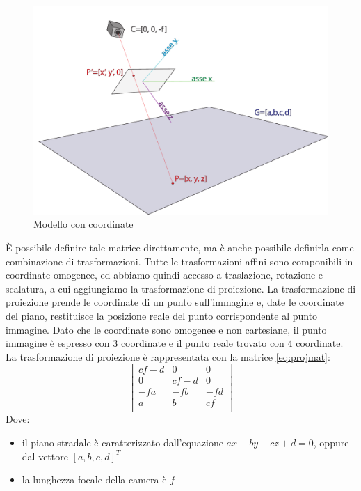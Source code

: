 \begin{figure}
    \caption{Modello con coordinate}
    \label{fig:camera coords}
    \centering
    \includegraphics[width=\textwidth]{images/camera coords.pdf}
\end{figure}

È possibile definire tale matrice direttamente, ma è anche possibile definirla come combinazione di trasformazioni.
Tutte le trasformazioni affini sono componibili in coordinate omogenee, ed abbiamo quindi accesso a traslazione, rotazione e scalatura, a cui aggiungiamo la trasformazione di proiezione.
La trasformazione di proiezione prende le coordinate di un punto sull'immagine e, date le coordinate del piano, restituisce la posizione reale del punto corrispondente al punto immagine.
Dato che le coordinate sono omogenee e non cartesiane, il punto immagine è espresso con 3 coordinate e il punto reale trovato con 4 coordinate.
La trasformazione di proiezione è rappresentata con la matrice \ref{eq:projmat}:
\begin{equation}
    \label{eq:projmat}
    \begin{bmatrix}
        cf - d & 0      & 0   \\
        0      & cf - d & 0   \\
        -fa    & -fb    & -fd \\
        a      & b      & cf  \\
    \end{bmatrix}
\end{equation}
Dove:
\begin{itemize}
    \item il piano stradale è caratterizzato dall'equazione $ax + by + cz + d = 0$, oppure dal vettore $[a, b, c, d]^T$
    \item la lunghezza focale della camera è $f$
\end{itemize}

